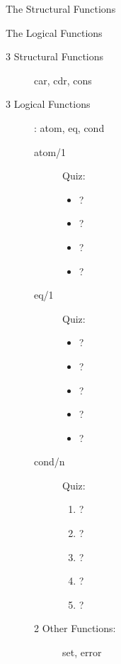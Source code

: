 \documentclass[fleqn]{beamer}
\begin{document}
\begin{frame}{The Structural Functions}
\begin{frame}{The Logical Functions}
\begin{description}
  \item[3 Structural Functions] car, cdr, cons
  \item[3 Logical Functions]: atom, eq, cond
    \begin{description}
      \item[atom/1] Quiz:
        \begin{itemize}
          \item {}?
          \item {}?
          \item {}?
          \item {}?
        \end{itemize}
      \item[eq/1] Quiz:
        \begin{itemize}
          \item {}?
          \item {}?
          \item {}?
          \item {}?
          \item {}?
        \end{itemize}
      \item[cond/n] Quiz:
        \begin{enumerate}
          \item {}?
          \item {}?
          \item {}?
          \item {}?
          \item {}?
        \end{enumerate}
      \item[2 Other Functions:] set, error
    \end{description}
\end{description}
\end{frame}


\end{frame}
\end{document}
